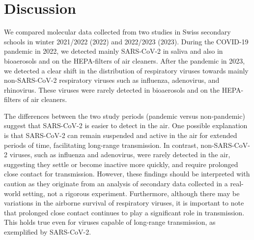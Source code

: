 \documentclass[fleqn,11pt]{wlscirep}
\begin{document}
\section*{Discussion}

We compared molecular data collected from two studies in Swiss secondary schools in winter 2021/2022 (2022) and 2022/2023 (2023). During the COVID-19 pandemic in 2022, we detected mainly SARS-CoV-2 in saliva and also in bioaerosols and on the HEPA-filters of air cleaners. After the pandemic in 2023, we detected a clear shift in the distribution of respiratory viruses towards mainly non-SARS-CoV-2 respiratory viruses such as influenza, adenovirus, and rhinovirus. These viruses were rarely detected in bioaerosols and on the HEPA-filters of air cleaners. 

The differences between the two study periods (pandemic versus non-pandemic) suggest that SARS-CoV-2 is easier to detect in the air. One possible explanation is that SARS-CoV-2 can remain suspended and active in the air for extended periods of time, facilitating long-range transmission. In contrast, non-SARS-CoV-2 viruses, such as influenza and adenovirus, were rarely detected in the air, suggesting they settle or become inactive more quickly, and require prolonged close contact for transmission. However, these findings should be interpreted with caution as they originate from an analysis of secondary data collected in a real-world setting, not a rigorous experiment. Furthermore, although there may be variations in the airborne survival of respiratory viruses, it is important to note that prolonged close contact continues to play a significant role in transmission. This holds true even for viruses capable of long-range transmission, as exemplified by SARS-CoV-2\cite{Leung2020NatMed,Lind2023NatCommun}.
\end{document}

